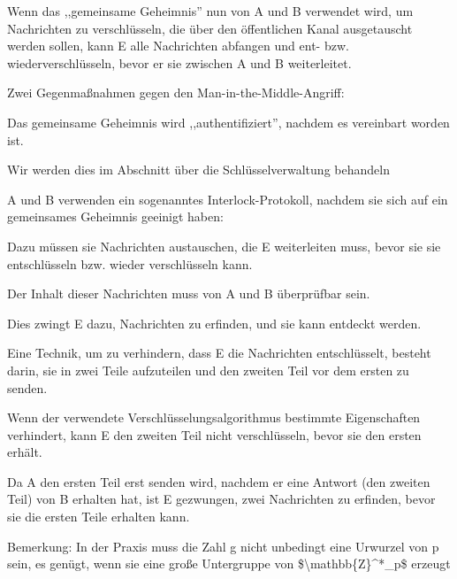 \documentclass[a4paper]{article}
\begin{document}
\begin{multicols}{3}
\begin{itemize*}
\begin{itemize*}
                  \item Wenn das ,,gemeinsame Geheimnis'' nun von A und B verwendet wird, um Nachrichten zu verschlüsseln, die über den öffentlichen Kanal ausgetauscht werden sollen, kann E alle Nachrichten abfangen und ent- bzw. wiederverschlüsseln, bevor er sie zwischen A und B weiterleitet.
            \end{itemize*}
            \item Zwei Gegenmaßnahmen gegen den Man-in-the-Middle-Angriff:
            \begin{itemize*}
                  \item Das gemeinsame Geheimnis wird ,,authentifiziert'', nachdem es vereinbart worden ist.
                  \begin{itemize*} \item Wir werden dies im Abschnitt über die Schlüsselverwaltung behandeln \end{itemize*}
                  \item A und B verwenden ein sogenanntes Interlock-Protokoll, nachdem sie sich auf ein gemeinsames Geheimnis geeinigt haben:
                  \begin{itemize*} \item Dazu müssen sie Nachrichten austauschen, die E weiterleiten muss, bevor sie sie entschlüsseln bzw. wieder verschlüsseln kann. \item Der Inhalt dieser Nachrichten muss von A und B überprüfbar sein. \item Dies zwingt E dazu, Nachrichten zu erfinden, und sie kann entdeckt werden. \item Eine Technik, um zu verhindern, dass E die Nachrichten entschlüsselt, besteht darin, sie in zwei Teile aufzuteilen und den zweiten Teil vor dem ersten zu senden.
                        \begin{itemize*} \item Wenn der verwendete Verschlüsselungsalgorithmus bestimmte Eigenschaften verhindert, kann E den zweiten Teil nicht verschlüsseln, bevor sie den ersten erhält. \item Da A den ersten Teil erst senden wird, nachdem er eine Antwort (den zweiten Teil) von B erhalten hat, ist E gezwungen, zwei Nachrichten zu erfinden, bevor sie die ersten Teile erhalten kann. \end{itemize*} \end{itemize*}
            \end{itemize*}
            \item Bemerkung: In der Praxis muss die Zahl g nicht unbedingt eine Urwurzel
            von p sein, es genügt, wenn sie eine große Untergruppe von
            \$\textbackslash mathbb\{Z\}\^{}*\_p\$ erzeugt
      \end{itemize*}



\end{multicols}
\end{document}
